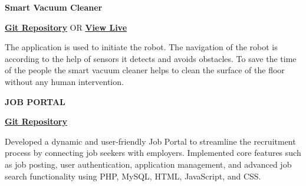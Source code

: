 \documentclass[a4paper]{article}
\begin{document}
    

    \vspace{4pt}
    \begin{minipage}{0.6\textwidth}
        \begin{flushleft}
            \textbf{\large Smart Vacuum Cleaner}
        \end{flushleft}
    \end{minipage}
    \begin{minipage}{0.4\textwidth}
        \begin{flushright}
            \href{https://github.com/Prosenjit-Mondol/Ardiuno_UNO_Project}{\textbf{\faGithub \hspace{0.1cm}Git Repository}} OR \href{https://www.youtube.com/watch?v=nY7cTv8nreg}{\textbf{\faPaperPlane\hspace{0.1cm}View Live}}
        \end{flushright}
    \end{minipage}
    The application is used to initiate the robot. The navigation of the robot is according to the help of sensors it detects and avoids obstacles. To save the time of the people the smart vacuum cleaner helps to clean the surface of the floor without any human intervention.


    \vspace{4pt}
    \begin{minipage}{0.6\textwidth}
        \begin{flushleft}
            \textbf{\large JOB PORTAL}
        \end{flushleft}
    \end{minipage}
    \begin{minipage}{0.4\textwidth}
        \begin{flushright}
           \href{https://github.com/pronad1/Web-Project}{\textbf{\faGithub \hspace{0.1cm} Git Repository}}
        \end{flushright}
    \end{minipage}
    Developed a dynamic and user-friendly Job Portal to streamline the recruitment process by connecting job seekers with employers. Implemented core features such as job posting, user authentication, application management, and advanced job search functionality using PHP, MySQL, HTML, JavaScript, and CSS.

    
    \vspace{4pt}




    
\end{document}
